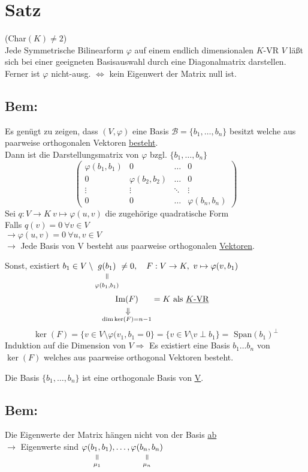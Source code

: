 \documentclass[titlepage,12pt,a4paper,ngerman]{report}
\newcommand{\verteq}{\rotatebox{90}{$\,=$}}
\newcommand{\equalto}[2]{\underset{\scriptstyle\overset{\mkern4mu\verteq}{#2}}{#1}}
\newcommand{\custo}[3]{\underset{\scriptstyle\overset{\mkern4mu\rotatebox{-90}{$\,#1$}}{#3}}{#2}}
\newcommand{\tx}[1]{\textrm{#1}}
\begin{document}
\section{Satz}
(Char$(K) \neq 2$)\\
\indent Jede Symmetrische Bilinearform $\varphi$ auf einem endlich dimensionalen $K$-VR $V$ läßt sich bei einer geeigneten Basisauswahl durch eine Diagonalmatrix darstellen. Ferner ist $\varphi$ nicht-ausg. $\Leftrightarrow$ kein Eigenwert der Matrix null ist.

\subsection*{Bem:}
Es genügt zu zeigen, dass $ (V,\varphi) $ eine Basis $ \mathcal{B} = \{b_1,\dots, b_n\} $ besitzt welche aus paarweise orthogonalen Vektoren \underline{besteht}.\\
Dann ist die Darstellungsmatrix von $ \varphi $ bzgl. $ \{b_1,\dots , b_n\}$
$$\begin{pmatrix}
\varphi(b_1,b_1) & 0 & \dots & 0 \\
0 & \varphi(b_2,b_2) & \dots & 0 \\
\vdots& \vdots & \ddots & \vdots \\
0 & 0 &\dots & \varphi(b_n,b_n)
\end{pmatrix}$$
Sei $ q: V \to K \ v \mapsto \varphi(u,v) $ die zugehörige quadratische Form\\
Falls $ q(v) = 0 \ \forall v \in V $\\
$ \rightarrow \varphi(u,v) = 0 \ \forall u,v \in V $\\
$ \rightarrow $ Jede Basis von V besteht aus paarweise orthogonalen \underline{Vektoren}.

Sonst, existiert $b_1 \in V\setminus \equalto{g(b_1)}{\varphi(b_1, b_1)} \neq 0, \quad F:V \to K,\ v \mapsto \varphi(v,b_1)$
$$\custo{\Rightarrow}{\tx{Im}(F)}{\dim \ker (F) = n -1} = K \tx{ als \underline{$K$-VR}}$$
$$\ker (F) = \{v \in V \setminus \varphi(v_1,b_1=0\} = \{v \in V \setminus v \perp b_1\} = \tx{ Span}(b_1)^\perp$$
Induktion auf die Dimension von $V \Rightarrow$ Es existiert eine Basis $b_1 \dots b_n$ von $\ker(F)$ welches aus paarweise orthogonal Vektoren besteht.

Die Basis $ \{b_1, \dots , b_n\} $ ist eine orthogonale Basis von \underline{\underline{V}}.\\
\subsection*{Bem:}
Die Eigenwerte der Matrix hängen nicht von der Basis \underline{ab}\\
$ \rightarrow $ Eigenwerte sind $ \equalto{\varphi(b_1,b_1)}{\mu_1} , \dots , \equalto{\varphi(b_n,b_n)}{\mu_n} $
\end{document}
